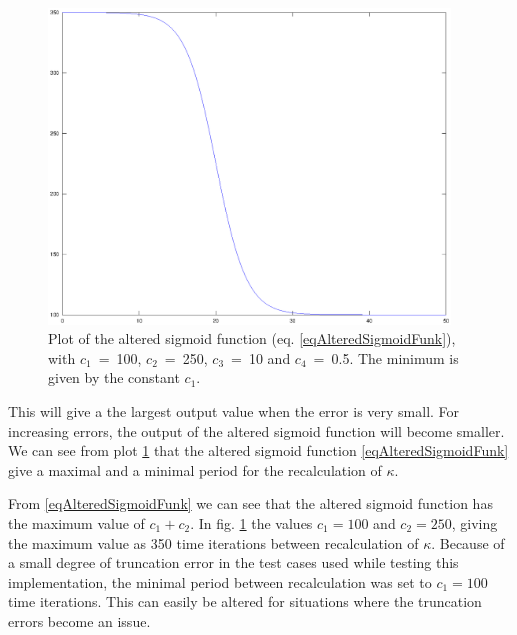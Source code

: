 		\begin{figure}[bht!]
			\begin{center}
				\includegraphics[width=0.95\textwidth]{sigmaPlot}
			\end{center}
			\caption{Plot of the altered sigmoid function (eq. \ref{eqAlteredSigmoidFunk}), with \mbox{$c_1$ = 100}, \mbox{$c_2$ = 250}, \mbox{$c_3$ = 10} and \mbox{$c_4$ = 0.5}. 
					The minimum is given by the constant $c_1$.  }
			\label{figAlteredSigmoidFunction}
		\end{figure}
	
		This will give a the largest output value when the error is very small. For increasing errors, the output of the altered sigmoid function will become smaller.
		We can see from plot \ref{figAlteredSigmoidFunction} that the altered sigmoid function \eqref{eqAlteredSigmoidFunk} give a maximal and a minimal period for the recalculation of $\kappa$.
	
		From \eqref{eqAlteredSigmoidFunk} we can see that the altered sigmoid function has the maximum value of $c_1+c_2$.
		In fig. \ref{figAlteredSigmoidFunction} the values $c_1 = 100$ and  $c_2 = 250$, giving the maximum value as 350 time iterations between recalculation of $\kappa$.
		Because of a small degree of truncation error in the test cases used while testing this implementation, the minimal period between recalculation was set to $c_1=100$ time iterations. 
		This can easily be altered for situations where the truncation errors become an issue.

